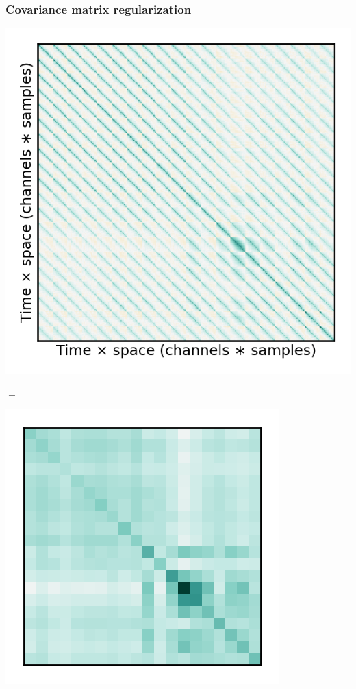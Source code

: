 \documentclass{kul-ulille-beamer}
\begin{document}
\begin{frame}[c]
  \frametitle{Covariance matrix regularization \\
  {\tiny\cite{VanDenKerchove2022}}}
  \begin{minipage}[c]{.3\textwidth}
  \includegraphics[width=\textwidth]{figures/decode/emp_cov_label.png}
  \end{minipage}
  $=$
  \begin{minipage}[c]{.3\textwidth}
    \begin{minipage}[c]{.4\textwidth}
      \includegraphics[width=\textwidth]{figures/decode/sp_cov_2.png}

\end{minipage}
\end{minipage}
\end{frame}
\end{document}
